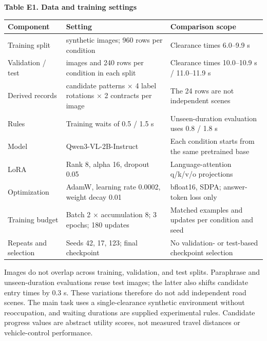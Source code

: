\documentclass[11pt,a4paper]{article}
\begin{document}
\par\medskip\noindent\begin{minipage}{\linewidth}
\textbf{Table E1. Data and training settings}\par

\par\medskip\noindent\begin{minipage}{\linewidth}\small
\begin{tabular}{@{}>{\raggedright\arraybackslash}p{}>{\raggedright\arraybackslash}p{}>{\raggedright\arraybackslash}p{}@{}}
\toprule
\textbf{Component} & \textbf{Setting} & \textbf{Comparison scope} \\
\midrule
Training split & 40 synthetic images; 960 rows per condition & Clearance times 6.0–9.9 s \\
Validation / test & 10 images and 240 rows per condition in each split & Clearance times 10.0–10.9 s / 11.0–11.9 s \\
Derived records & 3 candidate patterns × 4 label rotations × 2 contracts per image & The 24 rows are not independent scenes \\
Rules & Training waits of 0.5 / 1.5 s & Unseen-duration evaluation uses 0.8 / 1.8 s \\
Model & Qwen3-VL-2B-Instruct & Each condition starts from the same pretrained base \\
LoRA & Rank 8, alpha 16, dropout 0.05 & Language-attention q/k/v/o projections \\
Optimization & AdamW, learning rate 0.0002, weight decay 0.01 & bfloat16, SDPA; answer-token loss only \\
Training budget & Batch 2 × accumulation 8; 3 epochs; 180 updates & Matched examples and updates per condition and seed \\
Repeats and selection & Seeds 42, 17, 123; final checkpoint & No validation- or test-based checkpoint selection \\
\bottomrule\end{tabular}\end{minipage}\par\medskip
\end{minipage}\par\medskip

Images do not overlap across training, validation, and test splits. Paraphrase and unseen-duration evaluations reuse test images; the latter also shifts candidate entry times by 0.3 s. These variations therefore do not add independent road scenes. The main task uses a single-clearance synthetic environment without reoccupation, and waiting durations are supplied experimental rules. Candidate progress values are abstract utility scores, not measured travel distances or vehicle-control performance.\par
\end{document}

